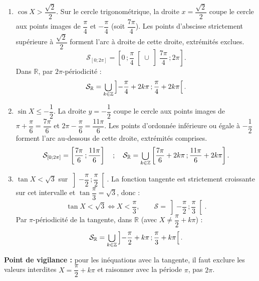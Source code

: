 \documentclass[11pt]{article}
\def\bigcup{\mathop{\mathchoice{\raisebox{-0.3em}{\scalebox{1.7}{$\cup$}}}{\scalebox{1.25}{$\cup$}}{\cup}{\cup}}\displaylimits}%
\begin{document}
\begin{corrige}
\begin{enumerate}
\item $\cos X>\dfrac{\sqrt{2}}{2}$. Sur le cercle trigonométrique, la droite $x=\dfrac{\sqrt{2}}{2}$ coupe le cercle aux points images de $\dfrac{\pi}{4}$ et $-\dfrac{\pi}{4}$ (soit $\dfrac{7\pi}{4}$). Les points d'abscisse strictement supérieure à $\dfrac{\sqrt{2}}{2}$ forment l'arc à droite de cette droite, extrémités exclues.
\[\mathcal{S}_{[0;2\pi]}=\left[0\,;\dfrac{\pi}{4}\right[\cup\left]\dfrac{7\pi}{4}\,;2\pi\right].\]
Dans $\mathbb{R}$, par $2\pi$-périodicité :
\[\mathcal{S}_{\mathbb{R}}=\bigcup_{k\in\mathbb{Z}}\left]-\dfrac{\pi}{4}+2k\pi\,;\dfrac{\pi}{4}+2k\pi\right[.\]
\item $\sin X\leq -\dfrac{1}{2}$. La droite $y=-\dfrac{1}{2}$ coupe le cercle aux points images de $\pi+\dfrac{\pi}{6}=\dfrac{7\pi}{6}$ et $2\pi-\dfrac{\pi}{6}=\dfrac{11\pi}{6}$. Les points d'ordonnée inférieure ou égale à $-\dfrac{1}{2}$ forment l'arc au-dessous de cette droite, extrémités comprises.
\[\mathcal{S}_{[0;2\pi]}=\left[\dfrac{7\pi}{6}\,;\dfrac{11\pi}{6}\right]\quad;\quad \mathcal{S}_{\mathbb{R}}=\bigcup_{k\in\mathbb{Z}}\left[\dfrac{7\pi}{6}+2k\pi\,;\dfrac{11\pi}{6}+2k\pi\right].\]
\item $\tan X<\sqrt{3}$ sur $\left]-\dfrac{\pi}{2}\,;\dfrac{\pi}{2}\right[$. La fonction tangente est strictement croissante sur cet intervalle et $\tan\dfrac{\pi}{3}=\sqrt{3}$, donc :
\[\tan X<\sqrt{3}\Longleftrightarrow X<\dfrac{\pi}{3},\qquad \mathcal{S}=\left]-\dfrac{\pi}{2}\,;\dfrac{\pi}{3}\right[.\]
Par $\pi$-périodicité de la tangente, dans $\mathbb{R}$ (avec $X\neq \dfrac{\pi}{2}+k\pi$) :
\[\mathcal{S}_{\mathbb{R}}=\bigcup_{k\in\mathbb{Z}}\left]-\dfrac{\pi}{2}+k\pi\,;\dfrac{\pi}{3}+k\pi\right[.\]
\end{enumerate}
\textbf{Point de vigilance :} pour les inéquations avec la tangente, il faut exclure les valeurs interdites $X=\dfrac{\pi}{2}+k\pi$ et raisonner avec la période $\pi$, pas $2\pi$.
\end{corrige}
\end{document}
